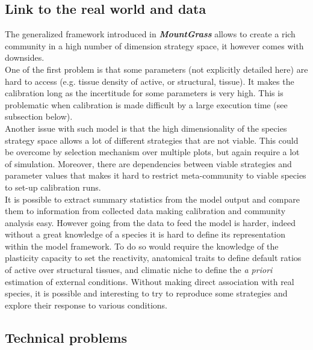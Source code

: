 \documentclass[a4paper,twoside, justified,marginals=raggedright]{tufte-handout}
\newcommand{\model}{\textit{\textbf{MountGrass }}}
\begin{document}
\subsection{Link to the real world and data}
The generalized framework introduced in \model allows to create a rich community in a high number of dimension strategy space, it however comes with downsides.\\
\indent One of the first problem is that some parameters (not explicitly detailed here) are hard to access (e.g. tissue density of active, or structural, tissue). It makes the calibration long as the incertitude for some parameters is very high. This is problematic when calibration is made difficult by a large execution time (see subsection below).\\
\indent Another issue with such model is that the high dimensionality of the species strategy space allows a lot of different strategies that are not viable. This could be overcome by selection mechanism over multiple plots, but again require a lot of simulation. Moreover, there are dependencies between viable strategies and parameter values that makes it hard to restrict meta-community to viable species to set-up calibration runs.\\
\indent It is possible to extract summary statistics from the model output and compare them to information from collected data making calibration and community analysis easy. However going from the data to feed the model is harder, indeed without a great knowledge of a species it is hard to define its representation within the model framework. To do so would require the knowledge of the plasticity capacity to set the reactivity, anatomical traits to define default ratios of active over structural tissues, and climatic niche to define the \textit{a priori} estimation of external conditions. Without making direct association with real species, it is possible and interesting to try to reproduce some strategies and explore their response to various conditions.

\subsection{Technical problems}
\end{document}
